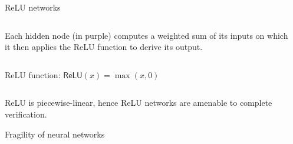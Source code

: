 \documentclass[10pt]{beamer}
\newcommand{\relu}[0]{\mathsf{ReLU}}
\begin{document}

\begin{frame}{ReLU networks}

\begin{columns}
\begin{column}{0.6\textwidth}
Each hidden node (in purple) computes a weighted sum of its
	inputs on which it then applies the ReLU function to derive its
	output.
\end{column}
\begin{column}{0.3\textwidth}
\end{column}
\end{columns}
\vspace{1em}


\begin{columns}
\begin{column}{0.6\textwidth}
\alert{ReLU function}: $\relu(x) = \max(x,0)$
\end{column}
\begin{column}{0.3\textwidth}
	
\end{column}
\end{columns}
\vspace{1em}
ReLU is \alert{piecewise-linear}, hence ReLU networks are amenable to
\alert{complete verification}.
\end{frame}
	

\begin{frame}{Fragility of neural networks}

\begin{figure}
	\centering
	
\end{figure}

\end{frame}
\end{document}

